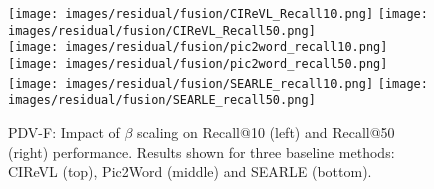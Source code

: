 \begin{figure*}[!h]
	\centering
	\texttt{[image: images/residual/fusion/CIReVL\_Recall10.png]}
	\texttt{[image: images/residual/fusion/CIReVL\_Recall50.png]}
	\\
	\texttt{[image: images/residual/fusion/pic2word\_recall10.png]}
	\texttt{[image: images/residual/fusion/pic2word\_recall50.png]}
	\\
	\texttt{[image: images/residual/fusion/SEARLE\_recall10.png]}
	\texttt{[image: images/residual/fusion/SEARLE\_recall50.png]}
	\caption{PDV-F: Impact of $\beta$ scaling on Recall@10 (left) and Recall@50 (right) performance. Results shown for three baseline methods: CIReVL (top), Pic2Word (middle) and SEARLE (bottom).}
	\label{fig:residual_fusion}
\end{figure*}
